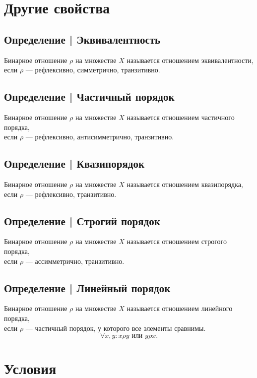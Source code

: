 \documentclass{article}
\begin{document}
\section{Другие свойства}

\subsection{Определение | Эквивалентность}
Бинарное отношение $\rho$ на множестве $X$ называется отношением эквивалентности, \\
если $\rho$ --- рефлексивно, симметрично, транзитивно.


\subsection{Определение | Частичный порядок}
Бинарное отношение $\rho$ на множестве $X$ называется отношением частичного порядка, \\
если $\rho$ --- рефлексивно, антисимметрично, транзитивно.


\subsection{Определение | Квазипорядок}
Бинарное отношение $\rho$ на множестве $X$ называется отношением квазипорядка, \\
если $\rho$ --- рефлексивно, транзитивно.


\subsection{Определение | Строгий порядок}
Бинарное отношение $\rho$ на множестве $X$ называется отношением строгого порядка, \\
если $\rho$ --- ассимметрично, транзитивно.


\subsection{Определение | Линейный порядок}
Бинарное отношение $\rho$ на множестве $X$ называется отношением линейного порядка, \\
если $\rho$ --- частичный порядок, у которого все элементы сравнимы.
\[
\forall x, y: x \rho y \text{ или } y \rho x.
\]



\section{Условия}
\end{document}
